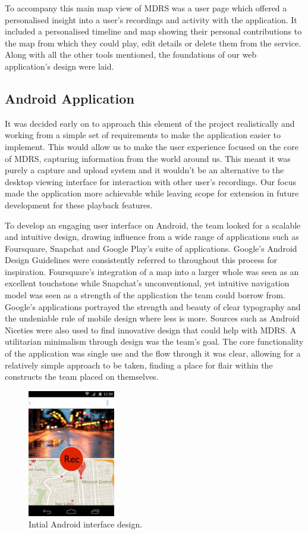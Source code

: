 \documentclass{l3proj}
\begin{document}
To accompany this main map view of MDRS was a user page which offered a
personalised insight into a user's recordings and activity with the application.
It included a personalised timeline and map showing their personal contributions
to the map from which they could play, edit details or delete them from the
service. Along with all the other tools mentioned, the foundations of our
web application's design were laid.

\subsection{Android Application} It was decided early on to approach this
element of the project realistically and working from a simple set of requirements to
make the application easier to implement. This would allow us to make the user experience focused on the core of MDRS, capturing information from the world around us. This meant it was purely a capture and upload system and it wouldn't be an alternative to the desktop viewing interface for interaction with other user's recordings. Our focus made the application more achievable while leaving scope for extension in future development for these playback features.

To develop an engaging user interface on Android, the team looked for a scalable and intuitive design, drawing influence from a wide range of applications such as Foursquare, Snapchat and Google Play’s suite of applications. Google's Android Design Guidelines were consistently referred to throughout this process for inspiration.  Foursquare's integration of a map into a larger whole was seen as an excellent touchstone while Snapchat's unconventional, yet intuitive navigation model was seen as a strength of the application the team could borrow from. Google's applications portrayed the strength and beauty of clear typography and the undeniable rule of mobile design where less is more. Sources such as Android Niceties were also used to find innovative design that could help with MDRS. A utilitarian minimalism through design was the team's goal. The core functionality of the application was single use and the flow through it was clear, allowing for a relatively simple approach to be taken, finding a place for flair within the constructs the team placed on themselves.

\begin{figure}[ht!]
\centering
\includegraphics[width=0.34\textwidth]{images/android-digital-prototype-1.jpg}
\caption{Intial Android interface design.}
\end{figure}
\end{document}
